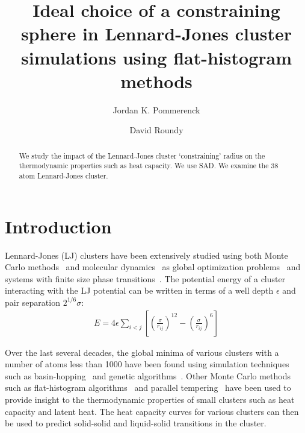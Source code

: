 \documentclass[letterpaper,twocolumn,amsmath,amssymb,pre,aps,10pt]{revtex4-1}
\begin{document}
\title{Ideal choice of a constraining sphere in Lennard-Jones cluster
simulations using flat-histogram methods
}

\author{Jordan K. Pommerenck} \author{David Roundy}

\begin{abstract}
  We study the impact of the Lennard-Jones cluster `constraining' radius on 
  the thermodynamic properties such as heat capacity. We use SAD. We examine
  the 38 atom Lennard-Jones cluster.
\end{abstract}

\maketitle

\section{Introduction}


Lennard-Jones (LJ) clusters have been extensively studied using both Monte Carlo methods~\cite{frantsuzov2005size, mandelshtam2006structural, mandelshtam2006multiple} and molecular dynamics~\cite{honeycutt1987molecular, calvo1995configurational, calvo2000phase} as global optimization problems~\cite{wales1997global, wales1998global, wales1999global, doye1999double} and systems with finite size phase transitions~\cite{neirotti2000phase, sabo2005pressure, sehgal2014phase}. The potential energy of a cluster interacting with the LJ potential can
be written in terms of a well depth $\epsilon$ and pair separation $2^{1/6}\sigma$:
\begin{align}
E = 4\epsilon \sum_{i<j} \left[ \left( \frac{\sigma}{r_{ij}} \right)^{12} - \left( \frac{\sigma}{r_{ij}} \right)^{6} \right]
\end{align}

Over the last several decades, the global minima of various clusters with a number of atoms less than 1000 have been
found using simulation techniques such as basin-hopping~\cite{wales1997global, yoo2003possible} and genetic algorithms~\cite{gregurick1996global, daven1996structural, doye1998thermodynamics}. Other Monte Carlo methods such as flat-histogram algorithms~\cite{poulain2006performances, pommerenck2020stochastic} and parallel tempering~\cite{mandelshtam2006multiple, mandelshtam2006structural} have been used to provide insight to the thermodynamic properties of small clusters such as heat capacity and latent heat. The heat capacity curves for various clusters can then be used to predict solid-solid and liquid-solid transitions in the cluster. 
\end{document}
